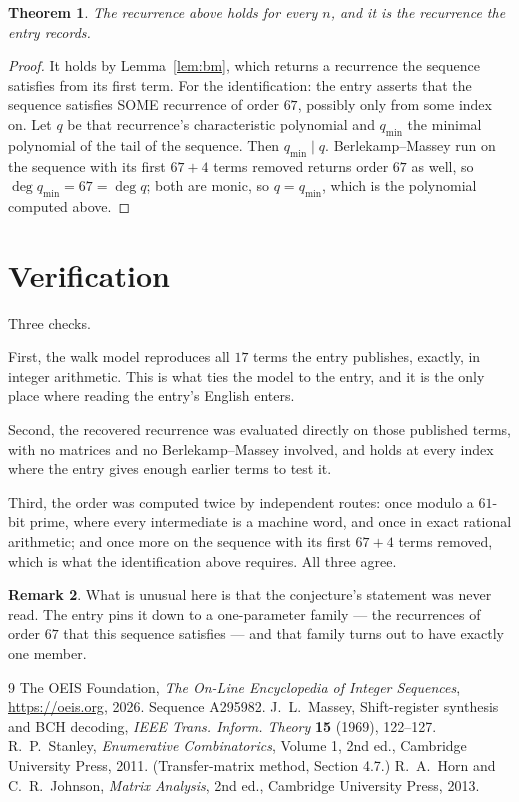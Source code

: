 \documentclass[11pt,a4paper]{article}
\theoremstyle{plain}
\newtheorem{theorem}{Theorem}
\theoremstyle{definition}
\newtheorem{remark}[theorem]{Remark}
\begin{document}
\begin{theorem}
The recurrence above holds for every $n$, and it is the recurrence the entry records.
\end{theorem}

\begin{proof}
It holds by Lemma~\ref{lem:bm}, which returns a recurrence the sequence satisfies from its
first term. For the identification: the entry asserts that the sequence satisfies SOME
recurrence of order $67$, possibly only from some index on. Let $q$ be that recurrence's
characteristic polynomial and $q_{\min}$ the minimal polynomial of the tail of the sequence.
Then $q_{\min}\mid q$. Berlekamp--Massey run on the sequence with its first $67+4$ terms
removed returns order $67$ as well, so $\deg q_{\min}=67=\deg q$; both are monic, so
$q=q_{\min}$, which is the polynomial computed above.
\end{proof}

\section{Verification}

Three checks.

First, the walk model reproduces all $17$ terms the entry publishes, exactly, in integer
arithmetic. This is what ties the model to the entry, and it is the only place where reading
the entry's English enters.

Second, the recovered recurrence was evaluated directly on those published terms, with no
matrices and no Berlekamp--Massey involved, and holds at every index where the entry gives
enough earlier terms to test it.

Third, the order was computed twice by independent routes: once modulo a $61$-bit prime, where
every intermediate is a machine word, and once in exact rational arithmetic; and once more on
the sequence with its first $67+4$ terms removed, which is what the identification above
requires. All three agree.

\begin{remark}
What is unusual here is that the conjecture's statement was never read. The entry pins it down
to a one-parameter family --- the recurrences of order $67$ that this sequence satisfies
--- and that family turns out to have exactly one member.
\end{remark}

\begin{thebibliography}{9}
 The OEIS Foundation, \emph{The On-Line Encyclopedia of Integer
Sequences}, \url{https://oeis.org}, 2026. Sequence A295982.
 J.~L.~Massey, Shift-register synthesis and BCH decoding, \emph{IEEE
Trans. Inform. Theory} \textbf{15} (1969), 122--127.
 R.~P.~Stanley, \emph{Enumerative Combinatorics}, Volume 1, 2nd ed.,
Cambridge University Press, 2011. (Transfer-matrix method, Section 4.7.)
 R.~A.~Horn and C.~R.~Johnson, \emph{Matrix Analysis}, 2nd ed., Cambridge
University Press, 2013.
\end{thebibliography}
\end{document}
